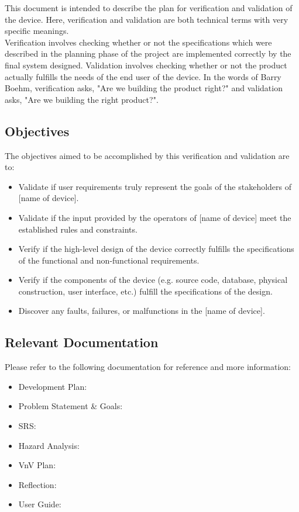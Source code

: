\documentclass[12pt, titlepage]{article}
\begin{document}
This document is intended to describe the plan for verification and validation of the device. Here, verification and validation are both technical terms with very specific meanings.\\

Verification involves checking whether or not the specifications which were described in the planning phase of the project are implemented correctly by the final system designed. Validation involves checking whether or not the product actually fulfills the needs of the end user of the device. In the words of Barry Boehm, verification asks, "Are we building the product right?" and validation asks, "Are we building the right product?"\cite{pham_1999}.

\subsection{Objectives}

The objectives aimed to be accomplished by this verification and validation are to:

\begin{itemize}
  \item Validate if user requirements truly represent the goals of the stakeholders of [name of device].
  \item Validate if the input provided by the operators of [name of device] meet the established rules and constraints.
  \item Verify if the high-level design of the device correctly fulfills the specifications of the functional and non-functional requirements.
  \item Verify if the components of the device (e.g. source code, database, physical construction, user interface, etc.) fulfill the specifications of the design.
  \item Discover any faults, failures, or malfunctions in the [name of device].
\end{itemize}

\subsection{Relevant Documentation}

Please refer to the following documentation for reference and more information:
\begin{itemize}
  \item Development Plan: \citet{Development_Plan}
  \item Problem Statement \& Goals: \citet{Prob_n_Goals}
  \item SRS: \citet{SRS}
  \item Hazard Analysis: \citet{Hazard_Analysis}
  \item VnV Plan: \citet{VnV_Plan}
  \item Reflection: \citet{Reflection}
  \item User Guide: \citet{User_Guide}
\end{itemize}
\end{document}
